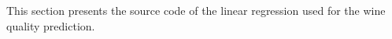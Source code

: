 This section presents the source code of the linear regression used for the wine quality prediction.



